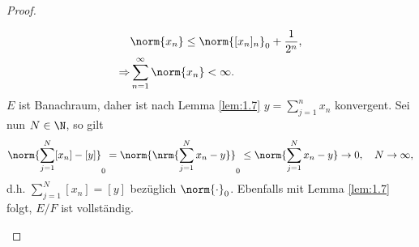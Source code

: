 \begin{proof}
\begin{proofenum}
\begin{align*}
&\norm{x_n} \le \norm{[x_n]_n}_0 + \frac{1}{2^n},\\
\Rightarrow & \sum\limits_{n=1}^\infty \norm{x_n} < \infty. 
\end{align*} 
$E$ ist Banachraum, daher ist nach Lemma \ref{lem:1.7} $y=\sum\limits_{j=1}^n
x_n$ konvergent. Sei nun $N\in\N$, so gilt
\begin{align*}
\norm{\sum\limits_{j=1}^N [x_n] - [y]}_0 = \norm{\nrm{\sum\limits_{j=1}^N x_n
- y}}_0 \le \norm{\sum\limits_{j=1}^N x_n-y} \to 0,\quad N\to \infty,
\end{align*}
d.h. $\sum\limits_{j=1}^N [x_n] = [y]$ bezüglich $\norm{\cdot}_0$.
Ebenfalls mit Lemma \ref{lem:1.7} folgt, $E/F$ ist vollständig.\qedhere
\end{proofenum}
\end{proof}


